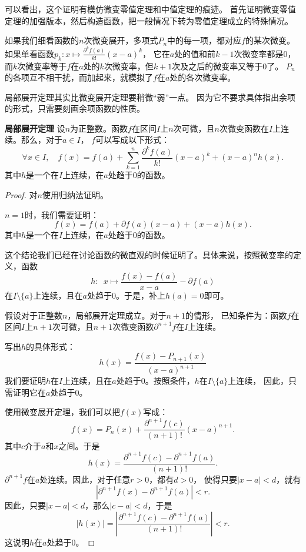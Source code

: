 \documentclass[12pt,UTF8,fontset=none]{ctexbook}
\begin{document}
\begin{appendix}
可以看出，这个证明有模仿微变零值定理和中值定理的痕迹。
首先证明微变零值定理的加强版本，然后构造函数，把一般情况下转为零值定理成立的特殊情况。

如果我们细看函数的$n$次微变展开，多项式$P_n$中的每一项，都对应$f$的某次微变。
如果单看函数$p_k: x\mapsto \frac{\partial^k f (a)}{k!}(x - a)^k$，
它在$a$处的值和前$k-1$次微变率都是$0$，而$k$次微变率等于$f$在$a$处的$k$次微变率，但$k+1$次及之后的微变率又等于$0$了。
$P_n$的各项互不相干扰，而加起来，就模拟了$f$在$a$处的各次微变率。

局部展开定理其实比微变展开定理要稍微“弱”一点。
因为它不要求具体指出余项的形式，只需要刻画余项函数的性质。

\begin{tm}{\textbf{局部展开定理}}
    设$n$为正整数。函数$f$在区间$I$上$n$次可微，且$n$次微变函数在$I$上连续。那么，对于$a\in I$，
    $f$可以写成以下形式：
    $$ \forall x \in I , \quad f(x) = f(a) + \sum_{k=1}^n \frac{\partial^k f (a)}{k!}(x - a)^k + (x - a)^n h(x). $$
    其中$h$是一个在$I$上连续，在$a$处趋于$0$的函数。
\end{tm}

\begin{proof}
    对$n$使用归纳法证明。

    $n=1$时，我们需要证明：
    $$ f(x) = f(a) + \partial f(a) (x - a) + (x - a) h(x). $$
    其中$h$是一个在$I$上连续，在$a$处趋于$0$的函数。
    
    这个结论我们已经在讨论函数的微直观的时候证明了。具体来说，按照微变率的定义，函数
    $$ h : \,\,\, x \mapsto \frac{f(x) - f(a)}{x - a} - \partial f(a) $$
    在$I\setminus\{a\}$上连续，且在$a$处趋于$0$。于是，补上$h(a) = 0$即可。

    假设对于正整数$n$，局部展开定理成立。对于$n+1$的情形，
    已知条件为：函数$f$在区间$I$上$n+1$次可微，且$n+1$次微变函数$\partial^{n+1} f$在$I$上连续。
    
    写出$h$的具体形式：
    $$ h(x) = \frac{f(x) - P_{n+1}(x)}{(x - a)^{n+1}} $$
    我们要证明$h$在$I$上连续，且在$a$处趋于$0$。按照条件，$h$在$I\setminus\{a\}$上连续，
    因此，只需证明它在$a$处趋于$0$。

    使用微变展开定理，我们可以把$f(x)$写成：
    $$ f(x) = P_n(x) + \frac{\partial^{n+1} f(c)}{(n + 1)!}(x - a)^{n+1}. $$
    其中$c$介于$a$和$x$之间。于是
    $$ h(x) = \frac{\partial^{n+1} f(c) - \partial^{n+1} f(a)}{(n + 1)!}. $$
    $\partial^{n+1} f$在$a$处连续。因此，对于任意$r>0$，都有$d > 0$，
    使得只要$|x - a| < d$，就有
    $$ \left| \partial^{n+1} f(x) - \partial^{n+1} f(a) \right| < r. $$
    因此，只要$|x - a| < d$，那么$|c - a| < d$，于是
    $$ |h(x)| = \left| \frac{\partial^{n+1} f(c) - \partial^{n+1} f(a)}{(n + 1)!} \right| < r .$$
    这说明$h$在$a$处趋于$0$。


\end{proof}
\end{appendix}
\end{document}
